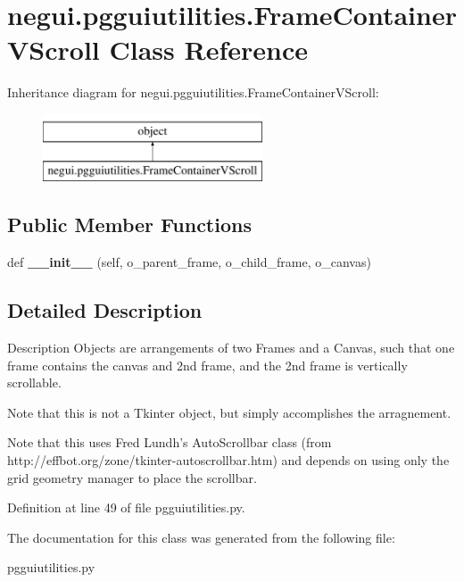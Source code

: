 \hypertarget{classnegui_1_1pgguiutilities_1_1FrameContainerVScroll}{}\section{negui.\+pgguiutilities.\+Frame\+Container\+V\+Scroll Class Reference}
\label{classnegui_1_1pgguiutilities_1_1FrameContainerVScroll}
Inheritance diagram for negui.\+pgguiutilities.\+Frame\+Container\+V\+Scroll\+:\begin{figure}[H]
\begin{center}
\leavevmode
\includegraphics[height=2.000000cm]{classnegui_1_1pgguiutilities_1_1FrameContainerVScroll}
\end{center}
\end{figure}
\subsection*{Public Member Functions}
\begin{DoxyCompactItemize}
\item 
def {\bfseries \+\_\+\+\_\+init\+\_\+\+\_\+} (self, o\+\_\+parent\+\_\+frame, o\+\_\+child\+\_\+frame, o\+\_\+canvas)\hypertarget{classnegui_1_1pgguiutilities_1_1FrameContainerVScroll_a77671bf20cb4175f0788de78bda3445f}{}\label{classnegui_1_1pgguiutilities_1_1FrameContainerVScroll_a77671bf20cb4175f0788de78bda3445f}

\end{DoxyCompactItemize}


\subsection{Detailed Description}
\begin{DoxyVerb}Description
Objects are arrangements of two Frames and a 
Canvas, such that one frame contains the 
canvas and 2nd frame, and the 2nd frame 
is vertically scrollable.

Note that this is not a Tkinter object, but
simply accomplishes the arragnement. 

Note that this uses Fred Lundh's AutoScrollbar class
(from http://effbot.org/zone/tkinter-autoscrollbar.htm)
and depends on using only the grid geometry manager to place
the scrollbar.
\end{DoxyVerb}
 

Definition at line 49 of file pgguiutilities.\+py.



The documentation for this class was generated from the following file\+:\begin{DoxyCompactItemize}
\item 
pgguiutilities.\+py\end{DoxyCompactItemize}
